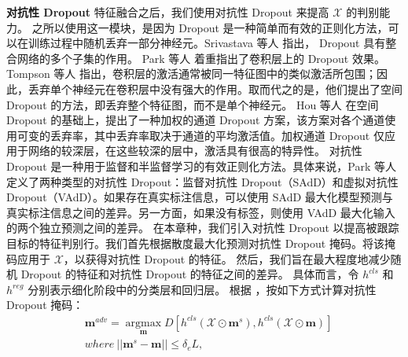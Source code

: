 \textbf{对抗性 Dropout} 特征融合之后，我们使用对抗性 Dropout \cite{park2018adversarial, lee2019drop} 来提高 $\mathcal{X}$ 的判别能力。
之所以使用这一模块，是因为 Dropout 是一种简单而有效的正则化方法，可以在训练过程中随机丢弃一部分神经元。Srivastava 等人 \cite{srivastava2014dropout} 指出， Dropout 具有整合网络的多个子集的作用。 Park 等人 \cite{park2016analysis} 着重指出了卷积层上的 Dropout 效果。Tompson 等人 \cite{tompson2015efficient} 指出，卷积层的激活通常被同一特征图中的类似激活所包围；因此，丢弃单个神经元在卷积层中没有强大的作用。取而代之的是，他们提出了空间 Dropout 的方法，即丢弃整个特征图，而不是单个神经元。 Hou 等人 \cite{hou2019weighted} 在空间 Dropout 的基础上，提出了一种加权的通道 Dropout 方案，该方案对各个通道使用可变的丢弃率，其中丢弃率取决于通道的平均激活值。加权通道 Dropout 仅应用于网络的较深层，在这些较深的层中，激活具有很高的特异性。
对抗性 Dropout 是一种用于监督和半监督学习的有效正则化方法。具体来说，Park 等人 \cite{park2018adversarial} 定义了两种类型的对抗性 Dropout：监督对抗性 Dropout（SAdD）和虚拟对抗性 Dropout（VAdD）。如果存在真实标注信息，可以使用 SAdD 最大化模型预测与真实标注信息之间的差异。另一方面，如果没有标签，则使用 VAdD 最大化输入的两个独立预测之间的差异。%
在本章种，我们引入对抗性 Dropout 以提高被跟踪目标的特征判别行。我们首先根据散度最大化预测对抗性 Dropout 掩码。将该掩码应用于 $\mathcal{X}$，以获得对抗性 Dropout 的特征。
然后，我们旨在最大程度地减少随机 Dropout 的特征和对抗性 Dropout 的特征之间的差异。
具体而言，令 $h^{cls}$ 和 $h^{reg}$ 分别表示细化阶段中的分类层和回归层。
根据 \cite{lee2019drop}，按如下方式计算对抗性 Dropout 掩码：
\begin{equation}
\begin{split}
    & \mathbf{m}^{adv} = \mathop{\arg\max}\limits_{\mathbf{m}}D[h^{cls}(\mathcal{X} \odot \mathbf{m}^s), h^{cls}(\mathcal{X} \odot \mathbf{m})] \\
    & where~||\mathbf{m}^s - \mathbf{m}|| \leq \delta_e L,
\end{split}
\end{equation}
